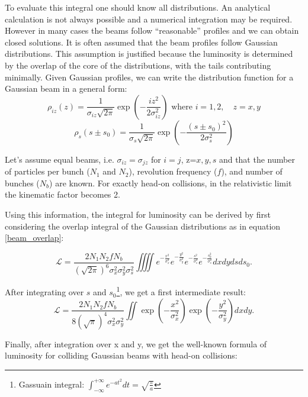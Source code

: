 To evaluate this integral one should know all distributions. An analytical calculation is not always possible and a numerical integration may be required. However in many cases the beams follow ``reasonable” profiles and we can obtain closed solutions. It is often assumed that the beam profiles follow Gaussian distributions. This assumption is justified because the luminosity is determined by the overlap of the core of the distributions, with the tails contributing minimally.
Given Gaussian profiles, we can write the distribution function for a Gaussian beam in a general form:
\begin{equation}
\rho_{iz}(z) =\frac{1}{\sigma_{iz}\sqrt{2\pi}} \exp\left( -\frac{iz^2}{2 \sigma_{iz}^2} \right) \text{ where } i=1,2, \quad z=x,y
\end{equation}
\begin{equation}
\rho_{s}(s\pm s_0) =\frac{1}{\sigma_s\sqrt{2\pi}} \exp\left( -\frac{(s\pm s_0)^2}{2 \sigma_s^2} \right)
\end{equation}

Let's assume equal beams, i.e.  $\sigma_{iz} = \sigma_{jz}$ for $i=j$, z=$x,y,s$ and that the number of particles per bunch (\( N_1 \) and \( N_2 \)), revolution frequency (\( f \)), and number of bunches (\( N_b \)) are known. For exactly head-on collisions, in the relativistic limit the kinematic factor becomes 2.

Using this information, the integral for luminosity can be derived by first considering the overlap integral of the Gaussian distributions as in equation \eqref{beam_overlap}:

\begin{equation}
\mathcal{L} = \frac{2  N_1 N_2 f N_b}{(\sqrt{2\pi})^6 \sigma_x^2\sigma_y^2\sigma_s^2}\iiiint e^{-\frac{x^2}{ \sigma_x^2}} e^{-\frac{y^2}{\sigma_y^2}} e^{-\frac{s^2}{\sigma_s^2}}e^{-\frac{s_0^2}{\sigma_s^2}}dxdydsds_0.
\end{equation}

After integrating over $s$ and $s_0$\footnote{Gassuain integral: $\int_{-\infty}^{+\infty}e^{-at^2}dt = \sqrt{\tfrac{\pi}{a}}$}, we get a first intermediate result:
\begin{equation}
    \mathcal{L} = \frac{2  N_1 N_2 f N_b}{8(\sqrt{\pi})^4 \sigma_x^2\sigma_y^2}\iint \exp\left(-\frac{x^2}{\sigma_x^2}\right) \exp\left(-\frac{y^2}{\sigma_y^2}\right) dxdy .\label{spec_lumi_gaus}
\end{equation}

Finally, after integration over x and y, we get the well-known formula of luminosity for colliding Gaussian beams with head-on collisions:

